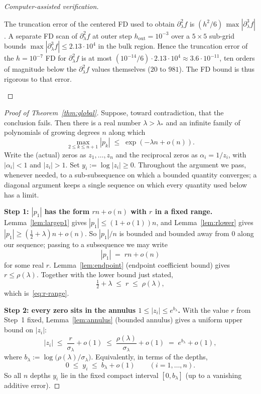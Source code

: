 \documentclass[11pt]{article}
\begin{document}
\begin{proof}[Computer-assisted verification]
\begin{enumerate}
The truncation error of the centered FD used to obtain
$\partial^2_\lambda f$ is
$(h^2/6)\,\max|\partial^3_\lambda f|$. A separate FD scan of
$\partial^2_\lambda f$ at outer step $h_{\mathrm{out}}=10^{-3}$ over a
$5\times 5$ sub-grid bounds
$\max|\partial^3_\lambda f|\le 2.13\cdot 10^4$ in the bulk region.
Hence the truncation error of the $h=10^{-7}$ FD for
$\partial^2_\lambda f$ is at most
$(10^{-14}/6)\cdot 2.13\cdot 10^4 \approx 3.6\cdot 10^{-11}$, ten
orders of magnitude below the $\partial^2_\lambda f$ values themselves
($20$ to $981$). The FD bound is thus rigorous to that error.
\end{enumerate}
\end{proof}

\begin{proof}[Proof of Theorem~\ref{thm:global}]
Suppose, toward contradiction, that the conclusion fails. Then there is a
real number $\lambda>\lambda_*$ and an infinite family of polynomials of
growing degrees $n$ along which
\[
        \max_{2\leq k\leq n+1}|p_k|\;\leq\;\exp(-\lambda n+o(n)).
\]
Write the (actual) zeros as $z_1,\dots,z_n$ and the reciprocal zeros as
$\alpha_i=1/z_i$, with $|\alpha_i|<1$ and $|z_i|>1$. Set
$y_i:=\log|z_i|\geq 0$. Throughout the argument we pass, whenever needed,
to a sub-subsequence on which a bounded quantity converges; a diagonal
argument keeps a single sequence on which every quantity used below has a
limit.

\medskip
\noindent\textbf{Step 1: $|p_1|$ has the form $rn+o(n)$ with $r$ in a fixed range.}
Lemma~\ref{lem:largep1} gives $|p_1|\leq(1+o(1))n$, and
Lemma~\ref{lem:rlower} gives $|p_1|\geq(\tfrac12+\lambda)n+o(n)$. So
$|p_1|/n$ is bounded and bounded away from $0$ along our sequence; passing
to a subsequence we may write
\[
        |p_1|\;=\;rn+o(n)
\]
for some real $r$. Lemma~\ref{lem:endpoint} (endpoint coefficient bound)
gives $r\leq\rho(\lambda)$. Together with the lower bound just stated,
\[
        \tfrac12+\lambda\;\leq\; r\;\leq\;\rho(\lambda),
\]
which is~\eqref{eq:r-range}.

\medskip
\noindent\textbf{Step 2: every zero sits in the annulus
$1\leq |z_i|\leq e^{b_\lambda}$.}
With the value $r$ from Step~1 fixed, Lemma~\ref{lem:annulus} (bounded
annulus) gives a uniform upper bound on $|z_i|$:
\[
        |z_i|\;\leq\;\frac{r}{\sigma_\lambda}+o(1)
        \;\leq\;\frac{\rho(\lambda)}{\sigma_\lambda}+o(1)
        \;=\;e^{b_\lambda}+o(1),
\]
where
\(b_\lambda:=\log\bigl(\rho(\lambda)/\sigma_\lambda\bigr)\). Equivalently,
in terms of the depths,
\[
        0\;\leq\;y_i\;\leq\; b_\lambda+o(1)
        \qquad(i=1,\dots,n).
\]
So all $n$ depths $y_i$ lie in the fixed compact interval $[0,b_\lambda]$
(up to a vanishing additive error).


\end{proof}
\end{document}

